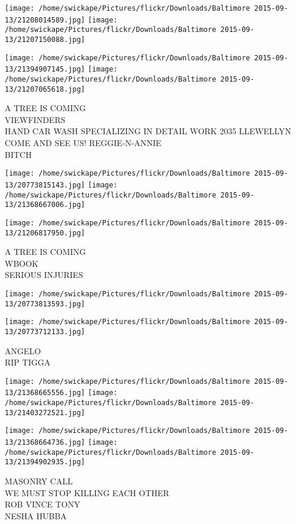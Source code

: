 \documentclass[10pt,letterpaper]{article}
\begin{document}
\texttt{[image: /home/swickape/Pictures/flickr/Downloads/Baltimore 2015-09-13/21208014589.jpg]}
\texttt{[image: /home/swickape/Pictures/flickr/Downloads/Baltimore 2015-09-13/21207150088.jpg]}

\texttt{[image: /home/swickape/Pictures/flickr/Downloads/Baltimore 2015-09-13/21394907145.jpg]}
\texttt{[image: /home/swickape/Pictures/flickr/Downloads/Baltimore 2015-09-13/21207065618.jpg]}

A TREE IS COMING\\
VIEWFINDERS\\
HAND CAR WASH SPECIALIZING IN DETAIL WORK 2035 LLEWELLYN COME AND SEE US!  REGGIE{-}N{-}ANNIE\\
BITCH\\
\pagebreak

\texttt{[image: /home/swickape/Pictures/flickr/Downloads/Baltimore 2015-09-13/20773815143.jpg]}
\texttt{[image: /home/swickape/Pictures/flickr/Downloads/Baltimore 2015-09-13/21368667006.jpg]}

\texttt{[image: /home/swickape/Pictures/flickr/Downloads/Baltimore 2015-09-13/21206817950.jpg]}

A TREE IS COMING\\
WBOOK\\
SERIOUS INJURIES\\
\pagebreak

\texttt{[image: /home/swickape/Pictures/flickr/Downloads/Baltimore 2015-09-13/20773813593.jpg]}

\vspace{0.25in}
\texttt{[image: /home/swickape/Pictures/flickr/Downloads/Baltimore 2015-09-13/20773712133.jpg]}

ANGELO\\
RIP TIGGA\\
\pagebreak

\texttt{[image: /home/swickape/Pictures/flickr/Downloads/Baltimore 2015-09-13/21368665556.jpg]}
\texttt{[image: /home/swickape/Pictures/flickr/Downloads/Baltimore 2015-09-13/21403272521.jpg]}

\texttt{[image: /home/swickape/Pictures/flickr/Downloads/Baltimore 2015-09-13/21368664736.jpg]}
\texttt{[image: /home/swickape/Pictures/flickr/Downloads/Baltimore 2015-09-13/21394902935.jpg]}

MASONRY CALL\\
WE MUST STOP KILLING EACH OTHER\\
ROB VINCE TONY\\
NESHA HUBBA\\
\pagebreak
\end{document}
